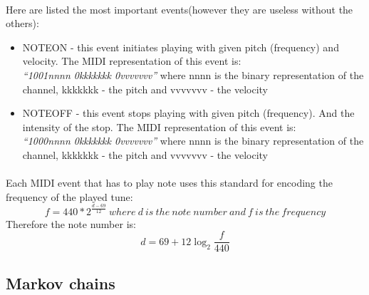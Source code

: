 \documentclass[]{article}
\begin{document}
            \paragraph{}Here are listed the most important events(however they are useless without the others):
            \begin{itemize}
                \item NOTEON - this event initiates playing with given pitch (frequency) and velocity. The MIDI representation of this event is:\\
                    \textit{``1001nnnn 0kkkkkkk 0vvvvvvv''} where nnnn is the binary representation of the channel, kkkkkkk - the pitch and vvvvvvv - the velocity
                \item NOTEOFF - this event stops playing with given pitch (frequency). And the intensity of the stop. The MIDI representation of this event is:\\
                    \textit{``1000nnnn 0kkkkkkk 0vvvvvvv''} where nnnn is the binary representation of the channel, kkkkkkk - the pitch and vvvvvvv - the velocity
            \end{itemize}
            \paragraph{} Each MIDI event that has to play note uses this standard for encoding the frequency of the played tune\cite{midifreq}:
            $$f = 440 * 2^\frac{d - 69}{12}\ where\ d\ is\ the\ note\ number\ and\ f\ is\ the\ frequency$$
            Therefore the note number is:
            $$d = 69 + 12\log_2 \frac{f}{440}$$
        \subsection{Markov chains}
\end{document}
